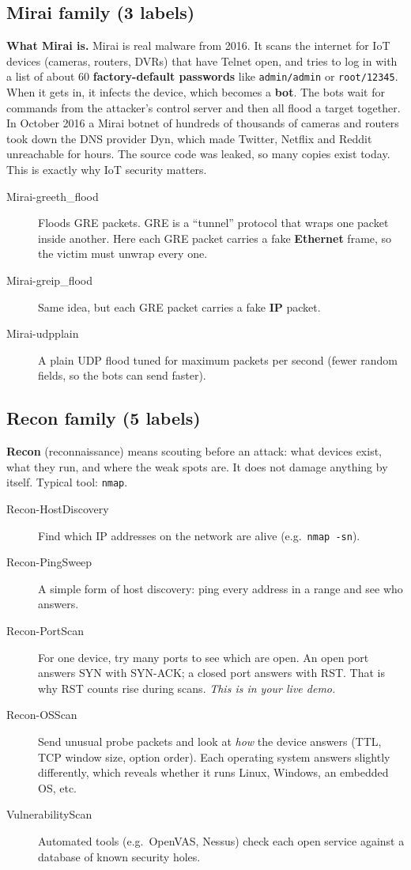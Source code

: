 \documentclass[11pt]{article}
\begin{document}
\subsection*{Mirai family (3 labels)}
\textbf{What Mirai is.} Mirai is real malware from 2016. It scans the internet for IoT devices (cameras, routers, DVRs) that have Telnet open,
and tries to log in with a list of about 60 \textbf{factory-default passwords} like \texttt{admin/admin} or \texttt{root/12345}.
When it gets in, it infects the device, which becomes a \textbf{bot}. The bots wait for commands from the attacker's control server and then all flood a target together.
In October 2016 a Mirai botnet of hundreds of thousands of cameras and routers took down the DNS provider Dyn, which made Twitter, Netflix and Reddit unreachable for hours.
The source code was leaked, so many copies exist today. This is exactly why IoT security matters.

\begin{description}
\item[Mirai-greeth\_flood] Floods GRE packets. GRE is a ``tunnel'' protocol that wraps one packet inside another. Here each GRE packet carries a fake \textbf{Ethernet} frame, so the victim must unwrap every one.
\item[Mirai-greip\_flood] Same idea, but each GRE packet carries a fake \textbf{IP} packet.
\item[Mirai-udpplain] A plain UDP flood tuned for maximum packets per second (fewer random fields, so the bots can send faster).
\end{description}

\subsection*{Recon family (5 labels)}
\textbf{Recon} (reconnaissance) means scouting before an attack: what devices exist, what they run, and where the weak spots are. It does not damage anything by itself. Typical tool: \texttt{nmap}.
\begin{description}
\item[Recon-HostDiscovery] Find which IP addresses on the network are alive (e.g.\ \texttt{nmap -sn}).
\item[Recon-PingSweep] A simple form of host discovery: ping every address in a range and see who answers.
\item[Recon-PortScan] For one device, try many ports to see which are open. An open port answers SYN with SYN-ACK; a closed port answers with RST. That is why RST counts rise during scans. \emph{This is in your live demo.}
\item[Recon-OSScan] Send unusual probe packets and look at \emph{how} the device answers (TTL, TCP window size, option order). Each operating system answers slightly differently, which reveals whether it runs Linux, Windows, an embedded OS, etc.
\item[VulnerabilityScan] Automated tools (e.g.\ OpenVAS, Nessus) check each open service against a database of known security holes.
\end{description}
\end{document}
